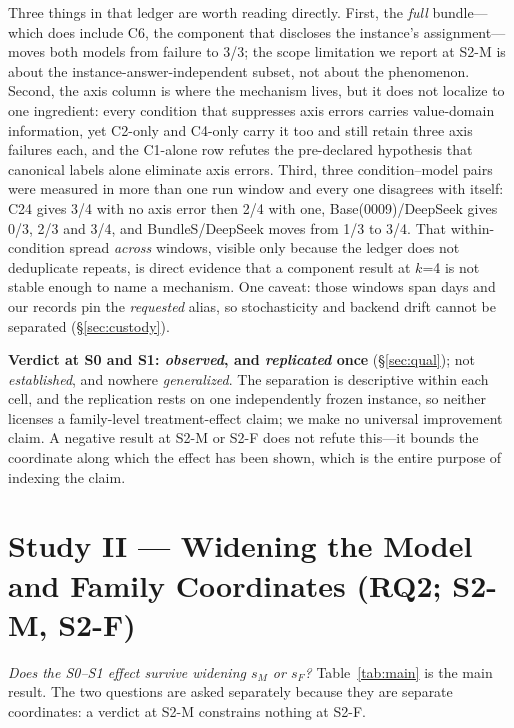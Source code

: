 \documentclass{article}
\begin{document}
Three things in that ledger are worth reading directly. First, the \emph{full} bundle---which does include C6, the component that discloses the instance's assignment---moves both models from failure to 3/3; the scope limitation we report at S2-M is about the instance-answer-independent subset, not about the phenomenon. Second, the axis column is where the mechanism lives, but it does not localize to one ingredient: every condition that suppresses axis errors carries value-domain information, yet C2-only and C4-only carry it too and still retain three axis failures each, and the C1-alone row refutes the pre-declared hypothesis that canonical labels alone eliminate axis errors. Third, three condition--model pairs were measured in more than one run window and every one disagrees with itself: C24 gives 3/4 with no axis error then 2/4 with one, Base(0009)/DeepSeek gives 0/3, 2/3 and 3/4, and BundleS/DeepSeek moves from 1/3 to 3/4. That within-condition spread \emph{across} windows, visible only because the ledger does not deduplicate repeats, is direct evidence that a component result at $k$=4 is not stable enough to name a mechanism. One caveat: those windows span \StatRunSpanDays{} days and our records pin the \emph{requested} alias, so stochasticity and backend drift cannot be separated (\S\ref{sec:custody}).

\textbf{Verdict at S0 and S1: \emph{observed}, and \emph{replicated} once} (\S\ref{sec:qual}); not \emph{established}, and nowhere \emph{generalized}. The separation is descriptive within each cell, and the replication rests on one independently frozen instance, so neither licenses a family-level treatment-effect claim; we make no universal improvement claim. A negative result at S2-M or S2-F does not refute this---it bounds the coordinate along which the effect has been shown, which is the entire purpose of indexing the claim.

\section{Study II --- Widening the Model and Family Coordinates (RQ2; S2-M, S2-F)}
\textit{Does the S0--S1 effect survive widening $s_M$ or $s_F$?} Table~\ref{tab:main} is the main result. The two questions are asked separately because they are separate coordinates: a verdict at S2-M constrains nothing at S2-F.
\end{document}
